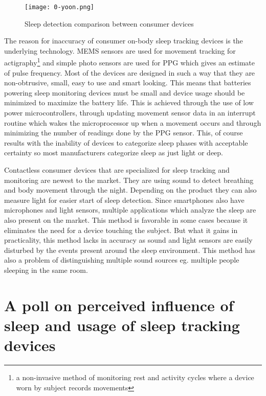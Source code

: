 \begin{figure}[h]
  \begin{center}
    \texttt{[image: 0-yoon.png]}
  \end{center}
  \caption{Sleep detection comparison between consumer devices}
  \label{fig:yoon}
\end{figure}

The reason for inaccuracy of consumer on-body sleep tracking devices is the underlying technology. \ac{MEMS} sensors are used for movement tracking for actigraphy\footnote{a non-invasive method of monitoring rest and activity cycles where a device worn by subject records movements} and simple photo sensors are used for \ac{PPG} which gives an estimate of pulse frequency. Most of the devices are designed in such a way that they are non-obtrusive, small, easy to use and smart looking. This means that batteries powering sleep monitoring devices must be small and device usage should be minimized to maximize the battery life. This is achieved through the use of low power microcontrollers, through updating movement sensor data in an interrupt routine which wakes the microprocessor up when a movement occurs and through minimizing the number of readings done by the \ac{PPG} sensor. This, of course results with the inability of devices to categorize sleep phases with acceptable certainty so most manufacturers categorize sleep as just light or deep.

Contactless consumer devices that are specialized for sleep tracking and monitoring are newest to the market. They are using sound to detect breathing and body movement through the night. Depending on the product they can also measure light for easier start of sleep detection. Since smartphones also have microphones and light sensors, multiple applications which analyze the sleep are also present on the market. This method is favorable in some cases because it eliminates the need for a device touching the subject. But what it gains in practicality, this method lacks in accuracy as sound and light sensors are easily disturbed by the events present around the sleep environment. This method has also a problem of distinguishing multiple sound sources eg. multiple people sleeping in the same room.


\section{A poll on perceived influence of sleep and usage of sleep tracking devices}

